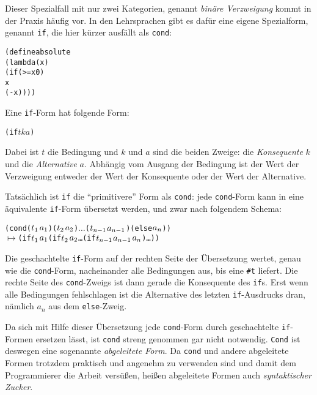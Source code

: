 %
Dieser Spezialfall mit nur zwei Kategorien, genannt \textit{binäre
  Verzweigung} kommt in der Praxis
häufig vor.  In den Lehrsprachen gibt es dafür eine eigene Spezialform,
genannt \texttt{if}, die hier kürzer ausfällt
als \texttt{cond}:
%
\begin{alltt}
(define absolute
  (lambda (x)
    (if (>= x 0)
        x
        (- x))))
\end{alltt}
%
Eine \texttt{if}-Form hat folgende Form:
%
\begin{alltt}
(if \(t\) \(k\) \(a\))
\end{alltt}
Dabei ist $t$ die Bedingung und $k$ und $a$ sind die
beiden Zweige: die \textit{Konsequente} $k$ und die
\textit{Alternative} $a$.  Abhängig vom Ausgang der
Bedingung ist der Wert der Verzweigung entweder der Wert der Konsequente
oder der Wert der Alternative.

Tatsächlich ist \texttt{if} die "`primitivere"' Form als
\texttt{cond}: jede \texttt{cond}-Form kann in eine äquivalente
\texttt{if}-Form übersetzt werden, und zwar nach
folgendem Schema:
%
\begin{alltt}
(cond (\(t\sb{1}\) \(a\sb{1}\)) (\(t\sb{2}\) \(a\sb{2}\)) \(\ldots\) (\(t\sb{n-1}\) \(a\sb{n-1}\)) (else \(a\sb{n}\)))
  \(\mapsto\) (if \(t\sb{1}\) \(a\sb{1}\) (if \(t\sb{2}\) \(a\sb{2}\) \ldots (if \(t\sb{n-1}\) \(a\sb{n-1}\) \(a\sb{n}\))\ldots))
\end{alltt}
%
Die geschachtelte \texttt{if}-Form auf der rechten Seite der
Übersetzung wertet, genau wie die \texttt{cond}-Form, nacheinander
alle Bedingungen aus, bis eine \verb|#t| liefert.  Die rechte Seite des
\texttt{cond}-Zweigs ist dann gerade die Konsequente des \texttt{if}s.
Erst wenn alle Bedingungen fehlschlagen ist die Alternative des letzten
\texttt{if}-Ausdrucks dran, nämlich $a_n$ aus dem \texttt{else}-Zweig.

Da sich mit Hilfe dieser Übersetzung jede \texttt{cond}-Form durch
geschachtelte \texttt{if}-Formen ersetzen lässt, ist \texttt{cond}
streng genommen gar nicht notwendig.  \texttt{Cond} ist deswegen eine
sogenannte \textit{abgeleitete Form}.  Da \texttt{cond} und andere
abgeleitete Formen trotzdem praktisch und angenehm zu verwenden sind
und damit dem Programmierer die Arbeit versüßen,
heißen abgeleitete Formen auch \textit{syntaktischer
  Zucker}.

